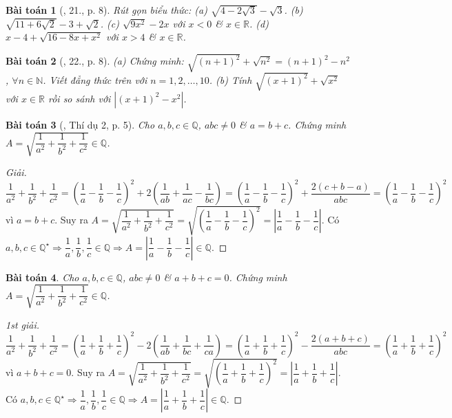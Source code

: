 \documentclass{article}
\newtheorem{baitoan}{Bài toán}
\begin{document}
\begin{baitoan}[\cite{SBT_Toan_9_tap_1}, 21., p. 8]
	Rút gọn biểu thức: (a) $\sqrt{4 - 2\sqrt{3}} - \sqrt{3}$. (b) $\sqrt{11 + 6\sqrt{2}} - 3 + \sqrt{2}$. (c) $\sqrt{9x^2} - 2x$ với $x < 0$ \& $x\in\mathbb{R}$. (d) $x - 4 + \sqrt{16 - 8x + x^2}$ với $x > 4$ \& $x\in\mathbb{R}$.
\end{baitoan}

\begin{baitoan}[\cite{SBT_Toan_9_tap_1}, 22., p. 8]
	(a) Chứng minh: $\sqrt{(n + 1)^2} + \sqrt{n^2} = (n + 1)^2 - n^2$, $\forall n\in\mathbb{N}$. Viết đẳng thức trên với $n = 1,2,\ldots,10$. (b) Tính $\sqrt{(x + 1)^2} + \sqrt{x^2}$ với $x\in\mathbb{R}$ rồi so sánh với $|(x + 1)^2 - x^2|$.
\end{baitoan}

\begin{baitoan}[\cite{Tuyen_Toan_9}, Thí dụ 2, p. 5]
	\label{prob: Tuyen_Toan_9 VD 2 p. 5}
	Cho $a,b,c\in\mathbb{Q}$, $abc\ne0$ \& $a = b + c$. Chứng minh $A = \sqrt{\dfrac{1}{a^2} + \dfrac{1}{b^2} + \dfrac{1}{c^2}}\in\mathbb{Q}$.
\end{baitoan}

\begin{proof}[Giải]
	$\dfrac{1}{a^2} + \dfrac{1}{b^2} + \dfrac{1}{c^2} = \left(\dfrac{1}{a} - \dfrac{1}{b} - \dfrac{1}{c}\right)^2 + 2\left(\dfrac{1}{ab} + \dfrac{1}{ac} - \dfrac{1}{bc}\right) = \left(\dfrac{1}{a} - \dfrac{1}{b} - \dfrac{1}{c}\right)^2 + \dfrac{2(c + b - a)}{abc} = \left(\dfrac{1}{a} - \dfrac{1}{b} - \dfrac{1}{c}\right)^2$ vì $a = b + c$. Suy ra $A = \sqrt{\dfrac{1}{a^2} + \dfrac{1}{b^2} + \dfrac{1}{c^2}} = \sqrt{\left(\dfrac{1}{a} - \dfrac{1}{b} - \dfrac{1}{c}\right)^2} = \left|\dfrac{1}{a} - \dfrac{1}{b} - \dfrac{1}{c}\right|$. Có $a,b,c\in\mathbb{Q}^\star\Rightarrow\dfrac{1}{a},\dfrac{1}{b},\dfrac{1}{c}\in\mathbb{Q}\Rightarrow A = \left|\dfrac{1}{a} - \dfrac{1}{b} - \dfrac{1}{c}\right|\in\mathbb{Q}$.
\end{proof}

\begin{baitoan}
	\label{prob: Mo rong Tuyen_Toan_9 VD 2 p. 5}
	Cho $a,b,c\in\mathbb{Q}$, $abc\ne0$ \& $a + b + c = 0$. Chứng minh $A = \sqrt{\dfrac{1}{a^2} + \dfrac{1}{b^2} + \dfrac{1}{c^2}}\in\mathbb{Q}$.
\end{baitoan}

\begin{proof}[1st giải]
	$\dfrac{1}{a^2} + \dfrac{1}{b^2} + \dfrac{1}{c^2} = \left(\dfrac{1}{a} + \dfrac{1}{b} + \dfrac{1}{c}\right)^2 - 2\left(\dfrac{1}{ab} + \dfrac{1}{bc} + \dfrac{1}{ca}\right) = \left(\dfrac{1}{a} + \dfrac{1}{b} + \dfrac{1}{c}\right)^2 - \dfrac{2(a + b + c)}{abc} = \left(\dfrac{1}{a} + \dfrac{1}{b} + \dfrac{1}{c}\right)^2$ vì $a + b + c = 0$. Suy ra $A = \sqrt{\dfrac{1}{a^2} + \dfrac{1}{b^2} + \dfrac{1}{c^2}} = \sqrt{\left(\dfrac{1}{a} + \dfrac{1}{b} + \dfrac{1}{c}\right)^2} = \left|\dfrac{1}{a} + \dfrac{1}{b} + \dfrac{1}{c}\right|$. Có $a,b,c\in\mathbb{Q}^\star\Rightarrow\dfrac{1}{a},\dfrac{1}{b},\dfrac{1}{c}\in\mathbb{Q}\Rightarrow A =\left|\dfrac{1}{a} + \dfrac{1}{b} + \dfrac{1}{c}\right|\in\mathbb{Q}$.
\end{proof}
\end{document}
